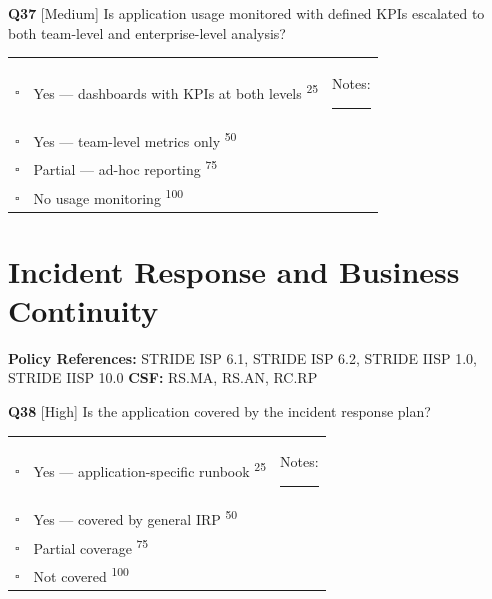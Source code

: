 \documentclass[11pt,landscape]{article}
\begin{document}
\vspace{0.3cm}

\noindent\colorbox{medbg}{\textbf{Q37} [Medium]} Is application usage monitored with defined KPIs escalated to both team-level and enterprise-level analysis?

\begin{tabularx}{\textwidth}{cXX}
$\square$ & Yes --- dashboards with KPIs at both levels \textsuperscript{\scriptsize\textcolor{stridegray}{25}} & Notes: \rule{4cm}{0.4pt} \\
$\square$ & Yes --- team-level metrics only \textsuperscript{\scriptsize\textcolor{stridegray}{50}} &  \\
$\square$ & Partial --- ad-hoc reporting \textsuperscript{\scriptsize\textcolor{stridegray}{75}} &  \\
$\square$ & No usage monitoring \textsuperscript{\scriptsize\textcolor{stridegray}{100}} &  \\
\end{tabularx}

\vspace{0.3cm}

\newpage

\section{Incident Response and Business Continuity}

\textbf{Policy References:} STRIDE ISP 6.1, STRIDE ISP 6.2, STRIDE IISP 1.0, STRIDE IISP 10.0 \hfill \textbf{CSF:} RS.MA, RS.AN, RC.RP

\noindent\colorbox{highbg}{\textbf{Q38} [High]} Is the application covered by the incident response plan?

\begin{tabularx}{\textwidth}{cXX}
$\square$ & Yes --- application-specific runbook \textsuperscript{\scriptsize\textcolor{stridegray}{25}} & Notes: \rule{4cm}{0.4pt} \\
$\square$ & Yes --- covered by general IRP \textsuperscript{\scriptsize\textcolor{stridegray}{50}} &  \\
$\square$ & Partial coverage \textsuperscript{\scriptsize\textcolor{stridegray}{75}} &  \\
$\square$ & Not covered \textsuperscript{\scriptsize\textcolor{stridegray}{100}} &  \\
\end{tabularx}

\vspace{0.3cm}
\end{document}
